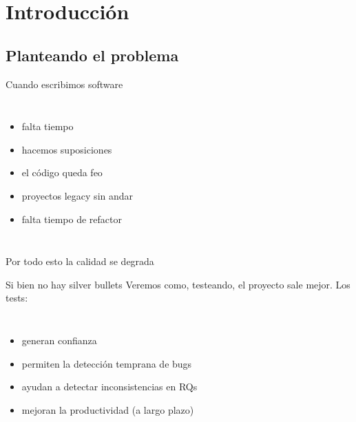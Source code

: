 \section{Introducci\'on}


\subsection{Planteando el problema}


\begin{frame}{Cuando escribimos software}
\begin{columns}[onlytextwidth]
	\begin{itemize}
		\item falta tiempo
		\item hacemos suposiciones
		\item el c\'odigo queda feo
		\item proyectos legacy sin andar
		\item falta tiempo de refactor
	\end{itemize}
\end{columns}
\begin{center}
	Por todo esto la calidad se degrada
\end{center}
\end{frame}

\begin{frame}{Si bien no hay silver bullets}
Veremos como, testeando, el proyecto sale mejor. Los tests:
\bigskip
\begin{columns}[onlytextwidth]
	\begin{itemize}
		\item generan confianza
		\item permiten la detecci\'on temprana de bugs
		\item ayudan a detectar inconsistencias en RQs
		\item mejoran la productividad (a largo plazo)
	\end{itemize}
\end{columns}
\end{frame}


